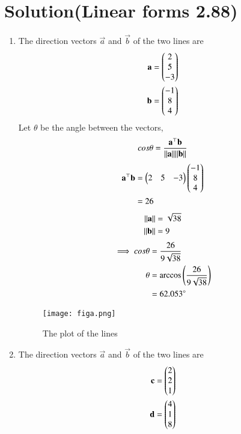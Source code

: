 \documentclass[journal,12pt,twocolumn]{IEEEtran}
\begin{document}
\section{Solution(Linear forms 2.88)}
\begin{enumerate}
    \item 
    The direction vectors $\vec{a}$ and $\vec{b}$ of the two lines are
    \begin{align}
        \mathbf{a}=\begin{pmatrix}2\\5\\-3\end{pmatrix}\\
        \mathbf{b}=\begin{pmatrix}-1\\8\\4\end{pmatrix}
    \end{align}
    Let $\theta$ be the angle between the vectors,
    \begin{align}
        cos\theta = \frac{\mathbf{a}^\top \mathbf{b}}{\lVert\mathbf{a}\rVert {\lVert\mathbf{b}\rVert}}
    \end{align}
    \begin{align}
        \mathbf{a}^\top\mathbf{b}&=\begin{pmatrix}2&5&-3\end{pmatrix}\begin{pmatrix}-1\\8\\4\end{pmatrix}\\
                           &=26
    \end{align}
    \begin{align}
        \lVert\mathbf{a}\rVert &=\sqrt{38}\\
        \lVert\mathbf{b}\rVert &=9
    \end{align}
    \begin{align}
        \implies cos\theta & = \frac{26}{9\sqrt{38}}\\
          \theta &= \arccos\left(\frac{26}{9\sqrt{38}}\right)\\
                 &= 62.053\degree
    \end{align}
    \begin{figure}[!ht]
    \centering
    \texttt{[image: figa.png]}
    \caption{The plot of the lines}
    \end{figure}
    \item 
    The direction vectors $\vec{a}$ and $\vec{b}$ of the two lines are
    \begin{align}
        \mathbf{c}=\begin{pmatrix}2\\2\\1\end{pmatrix}\\
        \mathbf{d}=\begin{pmatrix}4\\1\\8\end{pmatrix}
    \end{align}

\end{enumerate}
\end{document}
